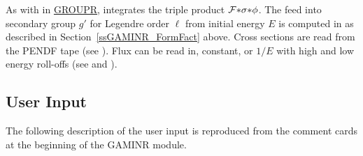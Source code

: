As with  in
\hyperlink{sGROUPRhy}{GROUPR}, 
integrates the triple product ${\cal F}{*}\sigma{*}\phi$.  The feed into
secondary group $g'$ for Legendre order $\ell$ from initial energy $E$
is computed in  as described in
Section~\ref{ssGAMINR_FormFact} above.  Cross sections are read from
the PENDF tape (see
).  Flux can be read in,
constant, or $1/E$ with high and low energy roll-offs (see
 and
).

\subsection{User Input}
\label{ssGAMINR_UserInp}

The following description of the user input is reproduced from
the comment cards at the beginning of the GAMINR module.

